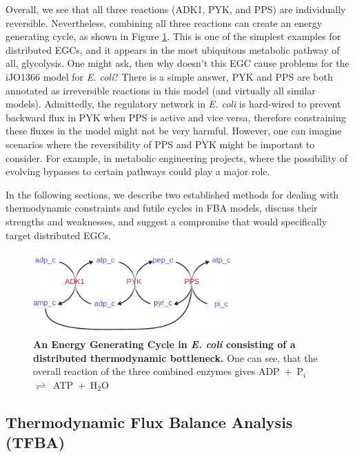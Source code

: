 \documentclass[twocolumn]{article}
\begin{document}
Overall, we see that all three reactions (ADK1, PYK, and PPS) are individually reversible. Nevertheless, combining all three reactions can create an energy generating cycle, as shown in Figure \ref{fig:distributed_egc}. This is one of the simplest examples for distributed EGCs, and it appears in the most ubiquitous metabolic pathway of all, glycolysis. One might ask, then why doesn't this EGC cause problems for the iJO1366 model for \emph{E. coli}? There is a simple answer, PYK and PPS are both annotated as irreversible reactions in this model (and virtually all similar models). Admittedly, the regulatory network in \emph{E. coli} is hard-wired to prevent backward flux in PYK when PPS is active and vice versa, therefore constraining these fluxes in the model might not be very harmful. However, one can imagine scenarios where the reversibility of PPS and PYK might be important to consider. For example, in metabolic engineering projects, where the possibility of evolving bypasses to certain pathways could play a major role.

In the following sections, we describe two established methods for dealing with thermodynamic constraints and futile cycles in FBA models, discuss their strengths and weaknesses, and suggest a compromise that would specifically target distributed EGCs.

\begin{figure}[ht!]
	\includegraphics[width=3in]{figure3.pdf}
	\caption{\textbf{An Energy Generating Cycle in \emph{E. coli} consisting of a distributed thermodynamic bottleneck.}
		One can see, that the overall reaction of the three combined enzymes gives ADP~+~P$_i$~$\rightleftharpoons$~ATP~+~H$_2$O}
	\label{fig:distributed_egc}
\end{figure}

\subsection{Thermodynamic Flux Balance Analysis (TFBA)}
\end{document}
